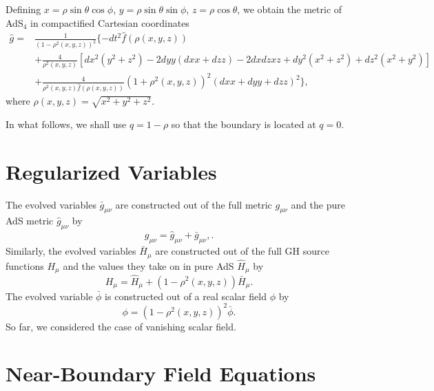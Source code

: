 \documentclass[12pt]{article}
\begin{document}
\noindent Defining $x=\rho\sin\theta\cos\phi$, $y=\rho\sin\theta\sin\phi$, $z=\rho\cos\theta$,  we obtain the metric of AdS$_4$ in compactified Cartesian coordinates
\begin{equation}
\begin{split}
\hat{g}=&\frac{1}{\left(1-\rho^2(x,y,z)\right)^2 }\{ -dt^2 \hat{f}(\rho(x,y,z)) \\
&+\frac{4}{\rho^2(x,y,z)} \left[dx^2
   \left(y^2+z^2\right)-2 dy y (dx x+dz z)-2 dx dz x
   z+dy^2 \left(x^2+z^2\right)+dz^2 \left(x^2+y^2\right)\right]\\
&+\frac{4}{\rho^2(x,y,z)\hat{f}(\rho(x,y,z))}
   \left(1+\rho^2(x,y,z)\right)^2 (dx x+dy y+dz z)^2 \},
   \end{split}
   \end{equation}
where $\rho(x,y,z)=\sqrt{x^2+y^2+z^2}$.

In what follows, we shall use $q=1-\rho$ so that the boundary is located at $q=0$. 



\section{Regularized Variables}

The evolved variables $\bar{g}_{\mu\nu}$ are constructed out of the full metric $g_{\mu\nu}$ and the pure AdS metric $\hat{g}_{\mu\nu}$ by
\begin{equation}
g_{\mu\nu} = \hat{g}_{\mu\nu} + \bar{g}_{\mu\nu}, \nonumber.
\end{equation}
Similarly, the evolved variables $\bar{H}_\mu$ are 
constructed out of the full GH source functions $H_\mu$ and the values they take on in pure AdS 
$\hat{H}_\mu$ by 
\begin{equation}
H_\mu = \hat{H}_\mu + (1-\rho^2(x,y,z)) \bar{H}_\mu. \nonumber 
\end{equation}
The evolved variable $\bar{\phi}$ is constructed out of a real scalar field $\phi$ by
\begin{equation}
\phi = (1-\rho^2(x,y,z))^2 \bar{\phi}. \nonumber
\end{equation} 
So far, we considered the case of vanishing scalar field.




\section{Near-Boundary Field Equations}
\end{document}
